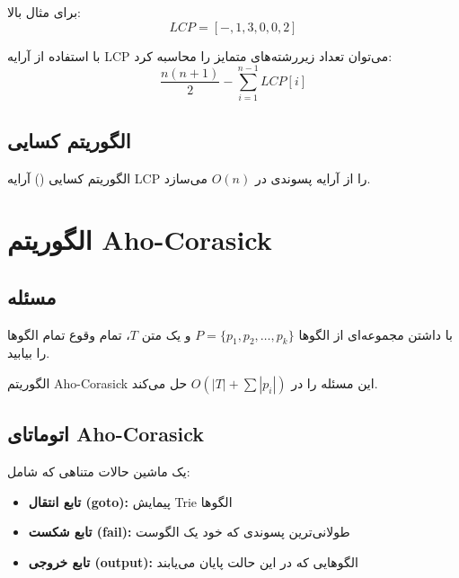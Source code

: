 \documentclass{matinbook}
\begin{document}
    برای مثال بالا:
    \[
    LCP = [-, 1, 3, 0, 0, 2]
    \]
    
    با استفاده از آرایه LCP می‌توان
    تعداد زیررشته‌های متمایز را محاسبه کرد:
    \[
    \frac{n(n+1)}{2} - \sum_{i=1}^{n-1} LCP[i]
    \]
    
    \subsection{الگوریتم کسایی}
    
    الگوریتم کسایی
    () آرایه LCP را
    از آرایه پسوندی در $O(n)$ می‌سازد.
    
    \section{الگوریتم Aho-Corasick}
    
    \subsection{مسئله}
    
    \begin{definition}
        با داشتن مجموعه‌ای از الگوها
        $P = \{p_{1}, p_{2}, \ldots, p_{k}\}$
        و یک متن $T$،
        تمام وقوع تمام الگوها را بیابید.
        \label{def:multi-pattern}
    \end{definition}
    
    الگوریتم Aho-Corasick
    این مسئله را در $O(|T| + \sum|p_{i}|)$
    حل می‌کند.
    
    \subsection{اتوماتای Aho-Corasick}
    
    \begin{definition}[اتوماتای AC]
        یک ماشین حالات متناهی که شامل:
        \begin{itemize}
            \item \textbf{تابع انتقال (goto):}
            پیمایش Trie الگوها
            \item \textbf{تابع شکست (fail):}
            طولانی‌ترین پسوندی که خود یک الگوست
            \item \textbf{تابع خروجی (output):}
            الگوهایی که در این حالت پایان می‌یابند
        \end{itemize}
        \label{def:ac-automaton}
    \end{definition}
    
\end{document}
